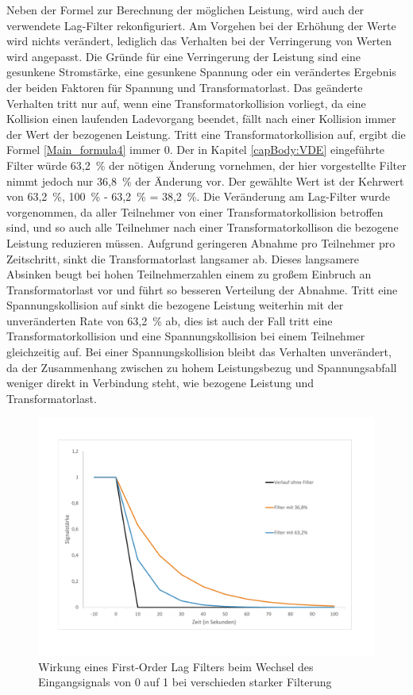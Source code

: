 Neben der Formel zur Berechnung der möglichen Leistung, wird auch der verwendete Lag-Filter rekonfiguriert. Am Vorgehen bei der Erhöhung der Werte wird nichts verändert, lediglich das Verhalten bei der Verringerung von Werten wird angepasst. Die Gründe für eine Verringerung der Leistung sind eine gesunkene Stromstärke, eine gesunkene Spannung oder ein verändertes Ergebnis der beiden Faktoren für Spannung und Transformatorlast. Das geänderte Verhalten tritt nur auf, wenn eine Transformatorkollision vorliegt, da eine Kollision einen laufenden Ladevorgang beendet, fällt nach einer Kollision immer der Wert der bezogenen Leistung. Tritt eine Transformatorkollision auf, ergibt die Formel \ref{Main_formula4} immer 0. Der in Kapitel \ref{capBody:VDE} eingeführte Filter würde 63,2~\% der nötigen Änderung vornehmen, der hier vorgestellte Filter nimmt jedoch nur 36,8~\% der Änderung vor. Der gewählte Wert ist der Kehrwert von 63,2~\%, 100~\% - 63,2~\% = 38,2~\%. Die Veränderung am Lag-Filter wurde vorgenommen, da aller Teilnehmer von einer Transformatorkollision betroffen sind, und so auch alle Teilnehmer nach einer Transformatorkollison die bezogene Leistung reduzieren müssen. Aufgrund geringeren Abnahme pro Teilnehmer pro Zeitschritt, sinkt die Transformatorlast langsamer ab. Dieses langsamere Absinken beugt bei hohen Teilnehmerzahlen einem zu großem Einbruch an Transformatorlast vor und führt so besseren Verteilung der Abnahme. Tritt eine Spannungskollision auf sinkt die bezogene Leistung weiterhin mit der unveränderten Rate von 63,2~\% ab, dies ist auch der Fall tritt eine Transformatorkollision und eine Spannungskollision bei einem Teilnehmer gleichzeitig auf. Bei einer Spannungskollision bleibt das Verhalten unverändert, da der Zusammenhang zwischen zu hohem Leistungsbezug und Spannungsabfall weniger direkt in Verbindung steht, wie bezogene Leistung und Transformatorlast. 
\begin{figure}[htb]
	\centering
	\includegraphics[scale=0.4]{img/lag_Filter6.pdf}
	\caption{Wirkung eines First-Order Lag Filters beim Wechsel des \newline Eingangsignals von 0 auf 1 bei verschieden starker Filterung}
	\label{SATrafo:lagFilter}
\end{figure}

